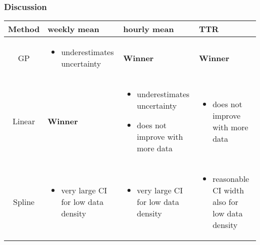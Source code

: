 \documentclass[
	8pt, %
]{beamer}
\begin{document}
\begin{frame}
	\frametitle{Discussion}

	\begin{table}
	\small
	\centering
	\begin{tabular}{|c|m{3.2cm}|m{3.2cm}|m{3.2cm}|}

  	\hline

  	Method & weekly mean & hourly mean & TTR \\
	\hline

	GP & \cellcolor{green}
	 \begin{itemize}
		 \item underestimates uncertainty
	 \end{itemize}

	& \cellcolor{green}\textbf{Winner}
	&
	\cellcolor{yellow}\textbf{Winner}
	\\
  	\hline

	Linear
	& \cellcolor{green}\textbf{Winner}
	& \cellcolor{red}
	 \begin{itemize}
		 \item underestimates uncertainty
		 \item does not improve with more data
	 \end{itemize}
	& \cellcolor{red}
	 \begin{itemize}
	 \item does not improve with more data
	 \end{itemize}
	\\
  	\hline

	Spline
	& \cellcolor{green}
	 \begin{itemize}
		 \item very large CI for low data density
	 \end{itemize}
	& \cellcolor{green}
	 \begin{itemize}
		 \item very large CI for low data density
	 \end{itemize}
	& \cellcolor{yellow}
	\begin{itemize}
		\item reasonable CI width also for low data density
	\end{itemize} \\
  	\hline
	\end{tabular}
	\end{table}

\end{frame}
\end{document}
